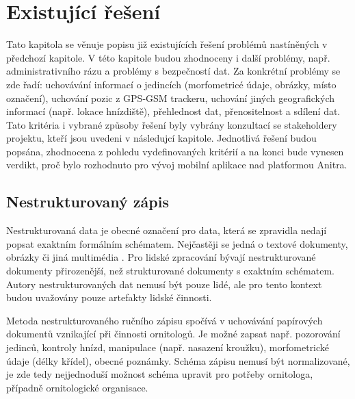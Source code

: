 
\chapter{Existující řešení}

Tato kapitola se věnuje popisu již existujících řešení problémů nastíněných v předchozí kapitole. V této kapitole budou zhodnoceny i další problémy, např. administrativního rázu a problémy s bezpečností dat. Za konkrétní problémy se zde řadí: uchovávání informací o jedincích (morfometricé údaje, obrázky, místo označení), uchování pozic z GPS-GSM trackeru, uchování jiných geografických informací (např. lokace hnízdiště), přehlednost dat, přenositelnost a sdílení dat. Tato kritéria i vybrané způsoby řešení byly vybrány konzultací se stakeholdery projektu, kteří jsou uvedeni v následujcí kapitole. Jednotlivá řešení budou popsána, zhodnocena z pohledu vydefinovaných kritérií a na konci bude vynesen verdikt, proč bylo rozhodnuto pro vývoj mobilní aplikace nad platformou Anitra. 

\section{Nestrukturovaný zápis}

Nestrukturovaná data je obecné označení pro data, která se zpravidla nedají popsat exaktním formálním schématem. Nejčastěji se jedná o textové dokumenty, obrázky či jiná multimédia \cite{podnikovaInformatikaNestrukturovanaData}. Pro lidské zpracování bývají nestrukturované dokumenty přirozenější, než strukturované dokumenty s exaktním schématem. Autory nestrukturovaných dat nemusí být pouze lidé, ale pro tento kontext budou uvažovány pouze artefakty lidské činnosti.

Metoda nestrukturovaného ručního zápisu spočívá v uchovávání papírových dokumentů vznikající při činnosti ornitologů. Je možné zapsat např. pozorování jedinců, kontroly hnízd, manipulace (např. nasazení kroužku), morfometrické údaje (délky křídel), obecné poznámky. Schéma zápisu nemusí být normalizované, je zde tedy nejjednoduší možnost schéma upravit pro potřeby ornitologa, případně ornitologické organisace.

